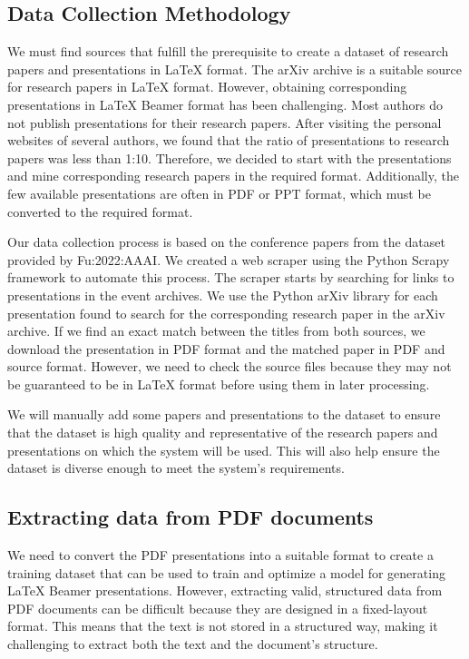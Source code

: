 \subsection{Data Collection Methodology}
We must find sources that fulfill the prerequisite to create a dataset of research papers and presentations in LaTeX format. The arXiv archive is a suitable source for research papers in LaTeX format. However, obtaining corresponding presentations in LaTeX Beamer format has been challenging. Most authors do not publish presentations for their research papers. After visiting the personal websites of several authors, we found that the ratio of presentations to research papers was less than 1:10. Therefore, we decided to start with the presentations and mine corresponding research papers in the required format. Additionally, the few available presentations are often in PDF or PPT format, which must be converted to the required format. 

Our data collection process is based on the conference papers from the dataset provided by Fu:2022:AAAI. We created a web scraper using the Python Scrapy framework to automate this process. The scraper starts by searching for links to presentations in the event archives. We use the Python arXiv library for each presentation found to search for the corresponding research paper in the arXiv archive. If we find an exact match between the titles from both sources, we download the presentation in PDF format and the matched paper in PDF and source format. However, we need to check the source files because they may not be guaranteed to be in LaTeX format before using them in later processing.

We will manually add some papers and presentations to the dataset to ensure that the dataset is high quality and representative of the research papers and presentations on which the system will be used. This will also help ensure the dataset is diverse enough to meet the system's requirements.

\subsection{Extracting data from PDF documents}
We need to convert the PDF presentations into a suitable format to create a training dataset that can be used to train and optimize a model for generating LaTeX Beamer presentations. However, extracting valid, structured data from PDF documents can be difficult because they are designed in a fixed-layout format. This means that the text is not stored in a structured way, making it challenging to extract both the text and the document's structure. 

